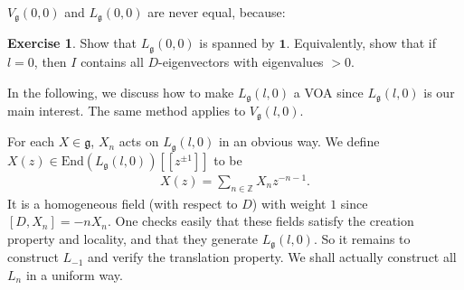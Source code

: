 \documentclass[12pt,a4paper,notitlepage]{article}
\theoremstyle{definition}
\newtheorem{exe}[df]{Exercise}
\theoremstyle{plain}
\newcommand{\End}{\mathrm{End}} %
\newcommand{\id}{\mathbf{1}}
\newcommand{\gk}{\mathfrak g}
\newcommand{\Zbb}{\mathbb Z}
\numberwithin{equation}{section}
\begin{document}
$V_\gk(0,0)$ and $L_\gk(0,0)$ are never equal, because:
\begin{exe}
Show that $L_\gk(0,0)$ is spanned by $\id$. Equivalently, show that if $l=0$, then $I$ contains all $D$-eigenvectors with eigenvalues $>0$.
\end{exe}


In the following, we discuss how to make $L_\gk(l,0)$ a VOA since $L_\gk(l,0)$ is our main interest. The same method applies to $V_\gk(l,0)$.



For each $X\in\gk$, $X_n$ acts on $L_\gk(l,0)$ in an obvious way. We define $X(z)\in\End(L_\gk(l,0))[[z^{\pm1}]]$ to be
\begin{align*}
	X(z)=\sum_{n\in\Zbb}X_nz^{-n-1}.
\end{align*}
It is a homogeneous field (with respect to $D$) with weight $1$ since $[D,X_n]=-nX_n$. One checks easily that these fields satisfy the creation property and locality, and that they  generate $L_\gk(l,0)$. So it remains to construct $L_{-1}$ and verify the translation property. We shall actually construct all $L_n$ in a uniform way.




\subsection{}
\end{document}
